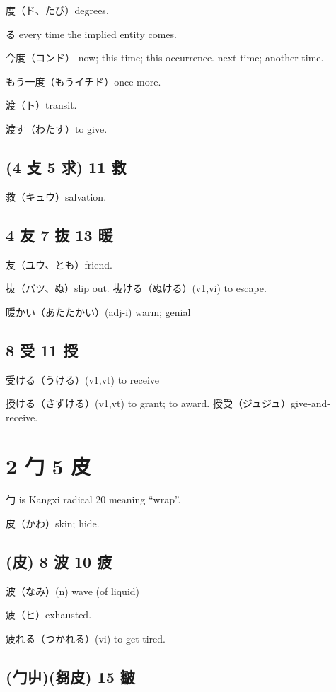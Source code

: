度（ド、たび）degrees.

る
every time the implied entity comes.

今度（コンド）
now; this time; this occurrence.
next time; another time.

もう一度（もうイチド）once more.

渡（ト）transit.

渡す（わたす）to give.

\subsection{(4 攴 5 求) 11 救}

救（キュウ）salvation.

\subsection{4 友 7 抜 13 暖}

友（ユウ、とも）friend.

抜（バツ、ぬ）slip out.
抜ける（ぬける）(v1,vi) to escape.

暖かい（あたたかい）(adj-i) warm; genial

\subsection{8 受 11 授}

受ける（うける）(v1,vt) to receive

授ける（さずける）(v1,vt) to grant; to award.
授受（ジュジュ）give-and-receive.

\section{2 勹 5 皮}

勹 is Kangxi radical 20 meaning ``wrap''.

皮（かわ）skin; hide.

\subsection{(皮) 8 波 10 疲}

波（なみ）(n) wave (of liquid)

疲（ヒ）exhausted.

疲れる（つかれる）(vi) to get tired.

\subsection{(勹屮)(芻皮) 15 皺}

